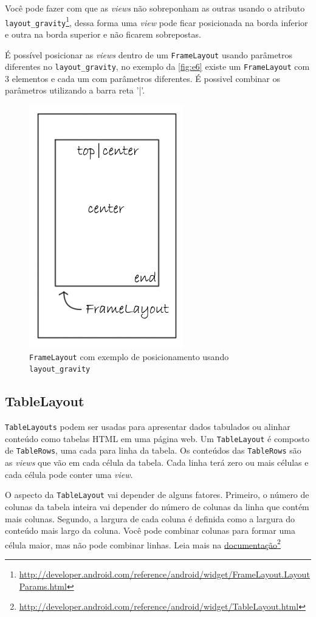 \documentclass[a4paper,12pt,brazil,oneside]{book}
\begin{document}
Você pode fazer com que as \emph{views} não sobreponham as outras usando o atributo \\ \texttt{layout\_gravity}\footnote{\href{http://developer.android.com/reference/android/widget/FrameLayout.LayoutParams.html}{http://developer.android.com/reference/android/widget/FrameLayout.LayoutParams.html}}, dessa forma uma \emph{view} pode ficar posicionada na borda inferior e outra na borda superior e não ficarem sobrepostas.

É possível posicionar as \emph{views} dentro de um \texttt{FrameLayout} usando parâmetros diferentes no \texttt{layout\_gravity}, no exemplo da \autoref{fig:e6} existe um \texttt{FrameLayout} com 3 elementos e cada um com parâmetros diferentes. É possivel combinar os parâmetros utilizando a barra reta '|'.

\begin{figure}[H]
  \centering
  \includegraphics[width=.25\textwidth]{figuras/design/framelayout_gravity.jpg}
  \caption{\texttt{FrameLayout} com exemplo de posicionamento usando \texttt{layout\_gravity}}
  \label{fig:e6}
\end{figure}

\subsection{TableLayout}

\texttt{TableLayouts} podem ser usadas para apresentar dados tabulados ou alinhar conteúdo como tabelas HTML em uma página web. Um \texttt{TableLayout} é composto de \texttt{TableRows}, uma cada para linha da tabela. Os conteúdos das \texttt{TableRows} são as \emph{views} que vão em cada célula da tabela. Cada linha terá zero ou mais células e cada célula pode conter uma \emph{view}. 

O aspecto da \texttt{TableLayout} vai depender de alguns fatores. Primeiro, o número de colunas da tabela inteira vai depender do número de colunas da linha que contém mais colunas. Segundo, a largura de cada coluna é definida como a largura do conteúdo mais largo da coluna. Você pode combinar colunas para formar uma célula maior, mas não pode combinar linhas. Leia mais na \href{http://developer.android.com/reference/android/widget/TableLayout.html}{documentação}\footnote{\href{http://developer.android.com/reference/android/widget/TableLayout.html}{http://developer.android.com/reference/android/widget/TableLayout.html}}
\end{document}
